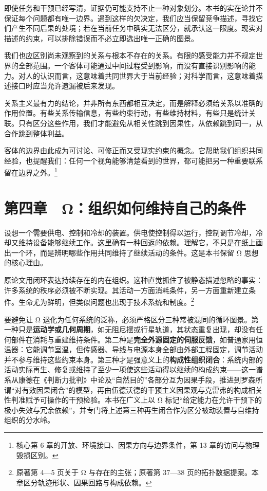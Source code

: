 \documentclass[
  11pt,
  oneside]{book}
\begin{document}
即使任务和干预已经写清，证据仍可能支持不止一种对象划分。本书的实在论并不保证每个问题都有唯一边界。遇到这样的欠决定，我们应当保留竞争描述，寻找它们产生不同后果的处境；若在当前任务中确实无法区分，就承认这一限度。现实对描述的约束，可以排除错误而不必立即选出唯一正确的图景。

我们也应区别尚未观察到的关系与根本不存在的关系。有限的感受能力并不规定世界的全部范围。一个客体可能通过中间过程受到影响，而没有直接识别影响的能力。对人的认识而言，这意味着共同世界大于当前经验；对科学而言，这意味着描述接口时应当允许遗漏被后来发现。

关系主义最有力的结论，并非所有东西都相互决定，而是解释必须给关系以准确的作用位置。有些关系传输信息，有些约束行动，有些维持材料，有些只是统计关联。只有区分这些作用，我们才能避免从相关性跳到因果性，从依赖跳到同一，从合作跳到整体利益。

\begingroup{}

客体的边界由此成为可讨论、可修正而又受现实约束的概念。它帮助我们组织共同经验，也提醒我们：任何一个视角能够清楚看到的世界，都可能把另一种重要联系留在边界之外。\footnote{\hypertarget{ph-note-9}{}核心第 6 章的开放、环境接口、因果方向与边界条件，第 13 章的访问与物理毁损区别。}

\par\endgroup

\chapter{第四章　Ω：组织如何维持自己的条件}\label{ph-ch-04}

设想一个需要供电、控制和冷却的装置。供电使控制得以运行，控制调节冷却，冷却又维持设备能够继续工作。这里确有一种回返的依赖。理解它，不只是在纸上画出一个环，而是辨明哪些作用共同维持了继续活动的条件。这是本书保留 Ω 思想的核心理由。

原论文用闭环表达持续存在的内在组织。这种直觉抓住了被静态描述忽略的事实：许多系统的秩序必须被不断实现。其活动一方面消耗条件，另一方面重新建立条件。生命尤为鲜明，但类似问题也出现于技术系统和制度。\footnote{\hypertarget{ph-note-10}{}原著第 4---5 页关于 Ω 与存在的主张；原著第 37---38 页的拓扑数据提案。本章区分轨迹形状、因果回路与构成依赖。}

要避免让 Ω 退化为任何系统的泛称，必须严格区分三种常被混同的循环图景。第一种只是\textbf{运动学或几何周期}，如无阻尼摆或行星轨道，其状态重复出现，却没有任何部件在消耗与重建维持条件。第二种是\textbf{完全外源固定的伺服反馈}，如普通家用恒温器：它能调节室温，但传感器、导线与电源本身全部由外部工程固定，调节活动并不参与维持这些约束本身。第三种才是强意义上的\textbf{构成性组织闭合}：系统内部的活动实际再生、修复或维持了至少一项使这些活动得以继续的构成约束------这一谱系从康德在《判断力批判》中论及``自然目的''各部分互为因果手段，推进到罗森所谓``对有效因果闭合''的模型，再由伍德沃德的干预主义因果观与克雷弗的构成相关性判准赋予可操作的干预检验。本书在广义上以 Ω 标记``给定能力在允许干预下的极小失效与冗余依赖''，并专门将上述第三种再生闭合作为区分被动装置与自维持组织的分水岭。
\end{document}
